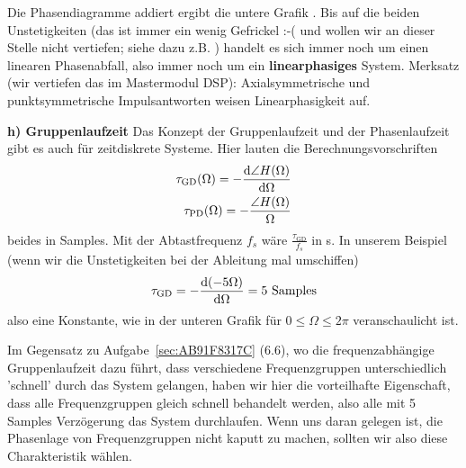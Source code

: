Die Phasendiagramme addiert ergibt die untere Grafik
. Bis auf die beiden Unstetigkeiten
(das ist immer ein wenig Gefrickel :-( und wollen wir an dieser
Stelle nicht vertiefen; siehe dazu z.B.
\cite{Oppenheim2010, Oppenheim2004})
handelt es sich immer noch um einen linearen Phasenabfall, also immer
noch um ein \textbf{linearphasiges} System.
%
Merksatz (wir vertiefen das im Mastermodul DSP): Axialsymmetrische und
punktsymmetrische Impulsantworten weisen Linearphasigkeit auf.

\textbf{h) Gruppenlaufzeit}
Das Konzept der Gruppenlaufzeit und der Phasenlaufzeit
gibt es auch für zeitdiskrete Systeme.
Hier lauten die Berechnungsvorschriften
\begin{align}
\tau_\text{GD}(\Omega) = -\frac{\mathrm{d} \angle H(\Omega)}{\mathrm{d} \Omega}\\
\tau_\text{PD}(\Omega) = -\frac{\angle H(\Omega)}{\Omega}
\end{align}
beides in Samples. Mit der Abtastfrequenz $f_s$ wäre
$\frac{\tau_\text{GD}}{f_s}$ in s.
%
In unserem Beispiel (wenn wir die Unstetigkeiten bei der Ableitung mal umschiffen)
\begin{align}
\tau_\text{GD} = -\frac{\mathrm{d} (-5 \Omega)}{\mathrm{d} \Omega} = 5\text{ Samples}\\
\end{align}
also eine Konstante, wie in der unteren Grafik für $0\leq \Omega \leq 2 \pi$
veranschaulicht ist.
\begin{center}
\end{center}
%
Im Gegensatz zu Aufgabe~\ref{sec:AB91F8317C} (6.6),
wo die frequenzabhängige Gruppenlaufzeit dazu führt,
dass verschiedene Frequenzgruppen unterschiedlich 'schnell' durch das System gelangen,
haben wir hier die vorteilhafte Eigenschaft, dass alle Frequenzgruppen
gleich schnell behandelt werden, also alle mit 5 Samples Verzögerung das
System durchlaufen.
Wenn uns daran gelegen ist, die Phasenlage von Frequenzgruppen nicht kaputt
zu machen, sollten wir also diese Charakteristik wählen.
%

